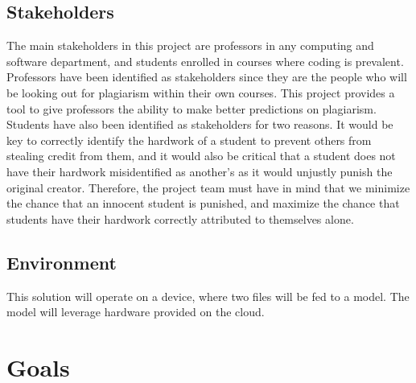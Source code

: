 \documentclass{article}
\begin{document}

\subsection{Stakeholders}
The main stakeholders in this project are professors in any computing and software department, and students enrolled in courses where coding is prevalent. Professors have been identified as stakeholders since they are the people who will be looking out for plagiarism within their own courses. This project provides a tool to give professors the ability to make better predictions on plagiarism. Students have also been identified as stakeholders for two reasons. It would be key to correctly identify the hardwork of a student to prevent others from stealing credit from them, and it would also be critical that a student does not have their hardwork misidentified as another's as it would unjustly punish the original creator. Therefore, the project team must have in mind that we minimize the chance that an innocent student is punished, and maximize the chance that students have their hardwork correctly attributed to themselves alone.

\subsection{Environment}
This solution will operate on a device, where two files will be fed to a model. The model will leverage hardware provided on the cloud.



\section{Goals}
\end{document}
